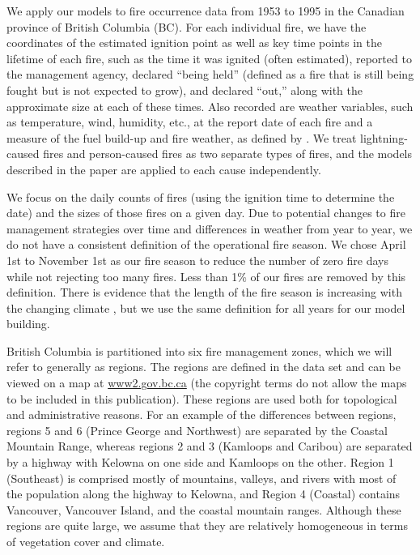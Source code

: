 \documentclass[10pt,letterpaper]{article}
\begin{document}
We apply our models to fire occurrence data from 1953 to 1995 in the
Canadian province of British Columbia (BC). For each individual fire, we have the coordinates of the estimated ignition point as well as key time points in the lifetime of each fire, such as the time it was ignited (often estimated), reported to the management agency, declared
``being held'' (defined as a fire that is still being fought but is not
expected to grow), and declared ``out,'' along with the approximate size
at each of these times. Also recorded are weather variables, such as temperature,
wind, humidity, etc., at the report date of each fire and a measure of
the fuel build-up and fire weather, as defined by
\cite{vanwagnerDevelopmentStructureCanadian1987a,wottonInterpretingUsingOutputs2009}. We treat
lightning-caused fires and person-caused fires as two separate types of
fires, and the models described in the paper are applied to each
cause independently.

We focus on the daily counts of fires (using the ignition time to
determine the date) and the sizes of those fires on a given day. Due to
potential changes to fire management strategies over time and differences in weather from year to year,
we do not have a consistent definition of the operational fire season.
We chose April 1st to
November 1st as our fire season to reduce the number of zero fire days
while not rejecting too many fires. Less than 1\% of our fires are
removed by this definition. There is evidence that the length of the
fire season is increasing with the changing climate
\cite{albert-greenMethodologyInvestigatingTrends2013,hanesFireregimeChangesCanada2019},
but we use the same definition for all years for our model building.

British Columbia is partitioned into six fire management zones, which we will refer to generally as regions. 
The regions are defined in the data set and can be viewed on a map at \url{www2.gov.bc.ca} (the copyright terms do not allow the maps to be included in this publication).
These regions are used both for topological and administrative reasons. 
For an example of the differences between regions, regions 5 and 6 (Prince George and Northwest) are separated by the Coastal Mountain Range, whereas regions 2 and 3 (Kamloops and Caribou) are separated by a highway with Kelowna on one side and Kamloops on the other.
Region 1 (Southeast) is comprised mostly of mountains, valleys, and rivers with most of the population along the highway to Kelowna, and Region 4 (Coastal) contains Vancouver, Vancouver Island, and the coastal mountain ranges.
Although these regions are quite large, we assume that they are relatively homogeneous in terms of vegetation cover and climate.
\end{document}
